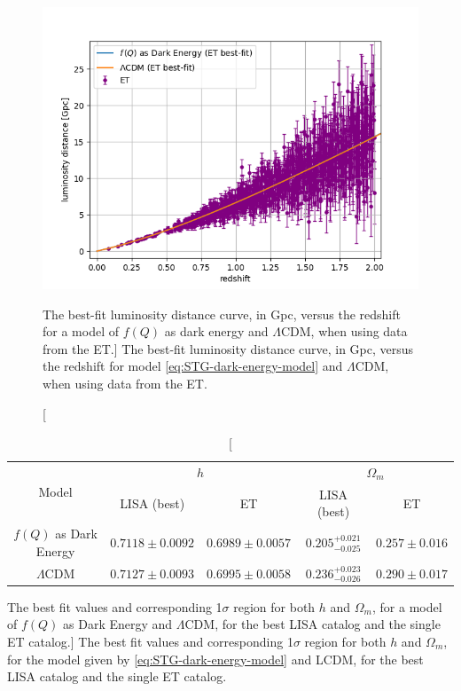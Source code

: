 \begin{figure}[h!]
    \centering
    \includegraphics[width=0.67\columnwidth]{figures/SS-fotisvsLCDM.png}
    \caption
    [The best-fit luminosity distance curve, in Gpc, versus the redshift for a model of $f(Q)$ as dark energy and $\Lambda$CDM, when using data from the ET.]
    {The best-fit luminosity distance curve, in Gpc, versus the redshift for model \cref{eq:STG-dark-energy-model} and $\Lambda$CDM, when using data from the \gls{ET}.}
    \label{fig:SS-fotisvsLCDM.png}
\end{figure}

\begin{table}[h!]
    \centering
    \begin{tabular}{|c|cc|cc|}
        \hline
        \multirow{2}{*}{Model} & \multicolumn{2}{c|}{$h$}              & \multicolumn{2}{c|}{$\Omega_m$}       \\ \cline{2-5}
                               & \multicolumn{1}{c|}{LISA (best)} & ET & \multicolumn{1}{c|}{LISA (best)} & ET \\ \hline
        $f(Q)$ as Dark Energy & \multicolumn{1}{c|}{$0.7118 \pm 0.0092$} & $0.6989 \pm 0.0057$ & \multicolumn{1}{c|}{$0.205^{+0.021}_{-0.025}$} & $0.257 \pm 0.016$ \\ \hline
        $\Lambda$CDM          & \multicolumn{1}{c|}{$0.7127 \pm 0.0093$} & $0.6995 \pm 0.0058$ & \multicolumn{1}{c|}{$0.236^{+0.023}_{-0.026}$} & $0.290 \pm 0.017$ \\ \hline
    \end{tabular}
    \caption
    [The best fit values and corresponding 1$\sigma$ region for both $h$ and $\Omega_m$, for a model of $f(Q)$ as Dark Energy and $\Lambda$CDM, for the best LISA catalog and the single ET catalog.]
    {The best fit values and corresponding 1$\sigma$ region for both $h$ and $\Omega_m$, for the model given by \cref{eq:STG-dark-energy-model} and \gls{LCDM}, for the best \gls{LISA} catalog and the single \gls{ET} catalog.}
    \label{tab:fotis-best-fit}
\end{table}

